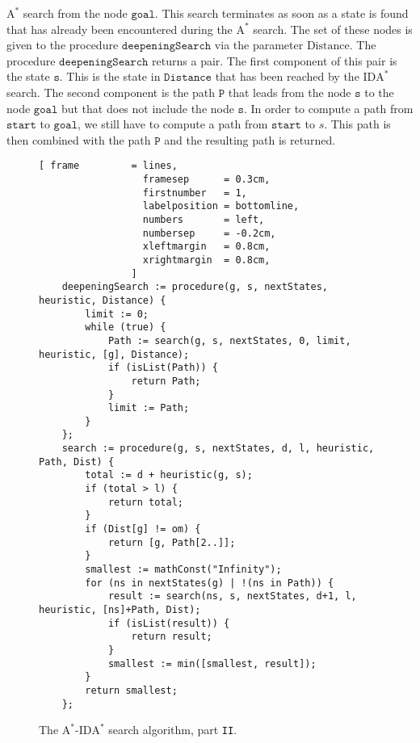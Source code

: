 \begin{enumerate}
      $\mathrm{A}^*$ search from the node $\mathtt{goal}$.  This search terminates as soon as a state is found
      that has already been encountered during the $\mathrm{A}^*$ search.  The set of these nodes is given to
      the procedure $\mathtt{deepeningSearch}$ via the parameter $\mathrm{Distance}$.  The procedure
      $\mathtt{deepeningSearch}$ returns a pair.  The first component of this pair is the state $\mathtt{s}$.  This is
      the state in $\mathtt{Distance}$ that has been reached by the $\mathrm{IDA}^*$ search.  The second component is the
      path $\mathtt{P}$ that leads from the node $\mathtt{s}$ to the node $\mathtt{goal}$ but that does not include the node $\mathtt{s}$.
      In order to compute a path from $\mathtt{start}$ to $\mathtt{goal}$, we still have to compute a
      path from $\mathtt{start}$ to $s$.  This path is then combined with the path $\mathtt{P}$ and the resulting path
      is returned.
\end{enumerate}


\begin{figure}[!ht]
\centering
\begin{Verbatim}[ frame         = lines, 
                  framesep      = 0.3cm, 
                  firstnumber   = 1,
                  labelposition = bottomline,
                  numbers       = left,
                  numbersep     = -0.2cm,
                  xleftmargin   = 0.8cm,
                  xrightmargin  = 0.8cm,
                ]
    deepeningSearch := procedure(g, s, nextStates, heuristic, Distance) {
        limit := 0;
        while (true) {
            Path := search(g, s, nextStates, 0, limit, heuristic, [g], Distance);
            if (isList(Path)) {
                return Path;
            }
            limit := Path;
        }
    };
    search := procedure(g, s, nextStates, d, l, heuristic, Path, Dist) {
        total := d + heuristic(g, s);
        if (total > l) {
            return total;
        }
        if (Dist[g] != om) {
            return [g, Path[2..]];
        }
        smallest := mathConst("Infinity");
        for (ns in nextStates(g) | !(ns in Path)) {
            result := search(ns, s, nextStates, d+1, l, heuristic, [ns]+Path, Dist);
            if (isList(result)) {
                return result;
            }
            smallest := min([smallest, result]);
        }
        return smallest;
    };
\end{Verbatim}
\vspace*{-0.3cm}
\caption{The $\mathrm{A}^*$-$\mathrm{IDA}^*$ search algorithm, part \texttt{II}.}
\label{fig:a-star-ida-star.stlx-2}
\end{figure}

